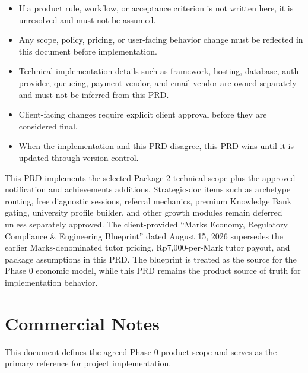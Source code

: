 \documentclass[11pt,a4paper]{article}
\begin{document}
\begin{itemize}
    \item If a product rule, workflow, or acceptance criterion is not written here, it is unresolved and must not be assumed.
    \item Any scope, policy, pricing, or user-facing behavior change must be reflected in this document before implementation.
    \item Technical implementation details such as framework, hosting, database, auth provider, queueing, payment vendor, and email vendor are owned separately and must not be inferred from this PRD.
    \item Client-facing changes require explicit client approval before they are considered final.
    \item When the implementation and this PRD disagree, this PRD wins until it is updated through version control.
\end{itemize}

This PRD implements the selected Package 2 technical scope plus the approved notification and achievements additions. Strategic-doc items such as archetype routing, free diagnostic sessions, referral mechanics, premium Knowledge Bank gating, university profile builder, and other growth modules remain deferred unless separately approved. The client-provided ``Marks Economy, Regulatory Compliance \& Engineering Blueprint'' dated August 15, 2026 supersedes the earlier Marks-denominated tutor pricing, Rp7,000-per-Mark tutor payout, and package assumptions in this PRD. The blueprint is treated as the source for the Phase 0 economic model, while this PRD remains the product source of truth for implementation behavior.

\section{Commercial Notes}

This document defines the agreed Phase 0 product scope and serves as the primary reference for project implementation.
\end{document}
